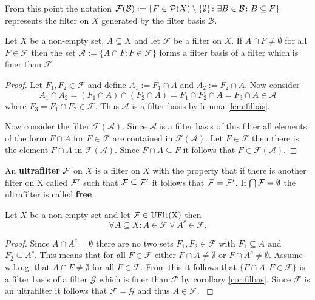 From this point the notation $\mathcal{F}(\mathcal{B}) := \{F \in \P(X)\setminus\{\emptyset\}\colon \exists B\in\mathcal{B}\colon B\subseteq F\}$ represents the filter on $X$ generated by the filter basis $\mathcal{B}$.

\begin{col}\label{cor:filbas}
  Let $X$ be a non-empty set, $A \subseteq X$ and let $\mathcal{F}$ be a filter on $X$. If $A \cap F \neq \emptyset$ for all $F\in\mathcal{F}$ then the set $\mathcal{A} := \{A \cap F\colon F\in \mathcal{F}\}$ forms a filter basis of a filter which is finer than $\mathcal{F}$.
\end{col}

\begin{proof}
  Let $F_1, F_2 \in \mathcal{F}$ and define $A_1 := F_1 \cap A$ and $A_2 := F_2 \cap A$. Now consider
  \begin{equation*}
    A_1 \cap A_2 = (F_1 \cap A) \cap (F_2 \cap A) = F_1 \cap F_2 \cap A = F_3 \cap A \in \mathcal{A}
  \end{equation*}
  where $F_3 = F_1 \cap F_2 \in \mathcal{F}$. Thus $\mathcal{A}$ is a filter basis by lemma \ref{lem:filbas}.

  Now consider the filter $\mathcal{F}(\mathcal{A})$. Since $\mathcal{A}$ is a filter basis of this filter all elements of the form $F \cap A$ for $F\in\mathcal{F}$ are contained in $\mathcal{F}(\mathcal{A})$. Let $F\in\mathcal{F}$ then there is the element $F\cap A$ in $\mathcal{F}(\mathcal{A})$. Since $F\cap A \subseteq F$ it follows that $F\in \mathcal{F}(\mathcal{A})$. 
\end{proof}

\begin{defin} 
  An \textbf{ultrafilter} $\F$ on $X$ is a filter on $X$ with the property that if there is another filter on X called $\F'$ such that $\F \subseteq \F'$ it follows that $\F = \F'$.
  If $\bigcap \F = \emptyset$ the ultrafilter is called \textbf{free}.
\end{defin}

\begin{lemma}\label{lem:ufltlemma}
  Let $X$ be a non-empty set and let $\mathcal{F} \in {\rm UFlt(X)}$ then
  \begin{equation*}
    \forall A \subseteq X\colon A \in \mathcal{F} \lor A^c \in \mathcal{F}.
  \end{equation*}
\end{lemma}

\begin{proof}
  Since $A \cap A^c = \emptyset$ there are no two sets $F_1, F_2 \in \mathcal{F}$ with $F_1 \subseteq A$ and $F_2 \subseteq A^c$. This means that for all $F \in \mathcal{F}$ either $F \cap A \neq \emptyset$ or $F \cap A^c \neq \emptyset$. Assume w.l.o.g. that $A \cap F \neq \emptyset$ for all $F \in \mathcal{F}$. From this it follows that $\{F \cap A\colon F\in \mathcal{F}\}$ is a filter basis of a filter $\mathcal{G}$ which is finer than $\mathcal{F}$ by corollary \ref{cor:filbas}. Since $\mathcal{F}$ is an ultrafilter it follows that $\mathcal{F} = \mathcal{G}$ and thus $A \in \mathcal{F}$. \cite[5.12 Satz]{BvQMT}
\end{proof}

